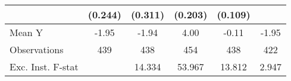 {\begin{tabular}{l*{5}{c}}
            &     (0.244)         &     (0.311)         &     (0.203)         &     (0.109)         &                     \\
\midrule
Mean Y      &       -1.95         &       -1.94         &        4.00         &       -0.11         &       -1.95         \\
Observations&         439         &         438         &         454         &         438         &         422         \\
Exc. Inst. F-stat&                     &      14.334         &      53.967         &      13.812         &       2.947         \\
\bottomrule
\end{tabular}
}
